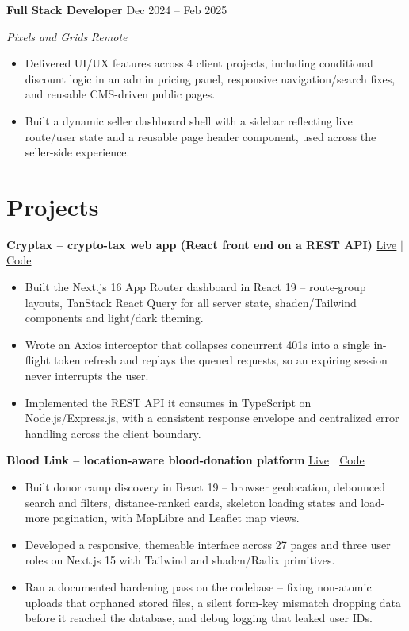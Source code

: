 \documentclass[letterpaper,10.5pt]{article}
\newcommand{\Entry}[4]{%
  \textbf{#1} \hfill {\small #2}\par
  \textit{\small #3} \hfill {\small\textit{#4}}\par\vspace{-1pt}}
\newcommand{\EntryLine}[2]{\textbf{#1} \hfill {\small #2}\par\vspace{-1pt}}
\newenvironment{Bullets}
  {\begin{itemize}[leftmargin=1.15em,itemsep=1.5pt,parsep=0pt,topsep=3pt]\small}
  {\end{itemize}\vspace{3pt}}
\begin{document}
\Entry{Full Stack Developer}{Dec 2024 -- Feb 2025}{Pixels and Grids}{Remote}
\begin{Bullets}
  \item Delivered UI/UX features across 4 client projects, including conditional discount logic in an admin pricing panel, responsive navigation/search fixes, and reusable CMS-driven public pages.
  \item Built a dynamic seller dashboard shell with a sidebar reflecting live route/user state and a reusable page header component, used across the seller-side experience.
\end{Bullets}

\section{Projects}
\EntryLine{Cryptax -- crypto-tax web app (React front end on a REST API)}{\href{https://cryp1ax.vercel.app}{Live} $|$ \href{https://github.com/Agent-Gautam/buddy-backend}{Code}}
\begin{Bullets}
  \item Built the Next.js 16 App Router dashboard in React 19 -- route-group layouts, TanStack React Query for all server state, shadcn/Tailwind components and light/dark theming.
  \item Wrote an Axios interceptor that collapses concurrent 401s into a single in-flight token refresh and replays the queued requests, so an expiring session never interrupts the user.
  \item Implemented the REST API it consumes in TypeScript on Node.js/Express.js, with a consistent response envelope and centralized error handling across the client boundary.
\end{Bullets}

\EntryLine{Blood Link -- location-aware blood-donation platform}{\href{https://blood-link2.vercel.app}{Live} $|$ \href{https://github.com/Agent-Gautam/blood-link-supabase}{Code}}
\begin{Bullets}
  \item Built donor camp discovery in React 19 -- browser geolocation, debounced search and filters, distance-ranked cards, skeleton loading states and load-more pagination, with MapLibre and Leaflet map views.
  \item Developed a responsive, themeable interface across 27 pages and three user roles on Next.js 15 with Tailwind and shadcn/Radix primitives.
  \item Ran a documented hardening pass on the codebase -- fixing non-atomic uploads that orphaned stored files, a silent form-key mismatch dropping data before it reached the database, and debug logging that leaked user IDs.
\end{Bullets}
\end{document}
